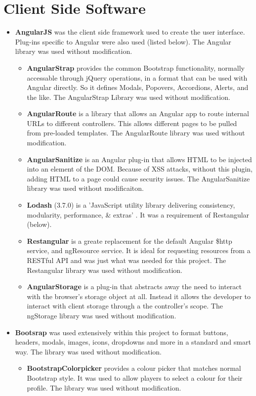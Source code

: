 \section{Client Side Software}
\begin{itemize}
	\item \textbf{AngularJS} \cite{Angular} was the client side framework used to create the user interface. Plug-ins specific to Angular were also used (listed below). The Angular library was used without modification.
	\begin{itemize}
		\item \textbf{AngularStrap} \cite{AngularStrap} provides the common Bootstrap functionality, normally accessable through jQuery operations, in a format that can be used with Angular directly. So it defines Modals, Popovers, Accordions, Alerts, and the like. The AngularStrap Library was used without modification.
		\item \textbf{AngularRoute} \cite{AngularRoute} is a library that allows an Angular app to route internal URLs to different controllers. This allows different pages to be pulled from pre-loaded templates. The AngularRoute library was used without modification.
		\item \textbf{AngularSanitize} \cite{AngularSanitize} is an Angular plug-in that allows HTML to be injected into an element of the DOM. Because of XSS attacks, without this plugin, adding HTML to a page could cause security issues. The AngularSanitize library was used without modificaiton.
		\item \textbf{Lodash} (3.7.0) is a 'JavaScript utility library delivering consistency, modularity, performance, \& extras' \cite{Lodash}. It was a requirement of Restangular (below).
		\item \textbf{Restangular} \cite{Restangular} is a greate replacement for the default Angular \$http service, and ngResource service. It is ideal for requesting resources from a RESTful API and was just what was needed for this project. The Restangular library was used without modification.
		\item \textbf{AngularStorage} \cite{ngStorage} is a plug-in that abstracts away the need to interact with the browser's storage object at all. Instead it allows the developer to interact with client storage through a the controller's scope. The ngStorage library was used without modification.
	\end{itemize}
	\item \textbf{Bootsrap} \cite{Bootstrap} was used extensively within this project to format buttons, headers, modals, images, icons, dropdowns and more in a standard and smart way. The library was used without modification.
	\begin{itemize}
		\item \textbf{BootstrapColorpicker} \cite{BootstrapCP} provides a colour picker that matches normal Bootstrap style. It was used to allow players to select a colour for their profile. The library was used without modification.
	\end{itemize}
\end{itemize}	


